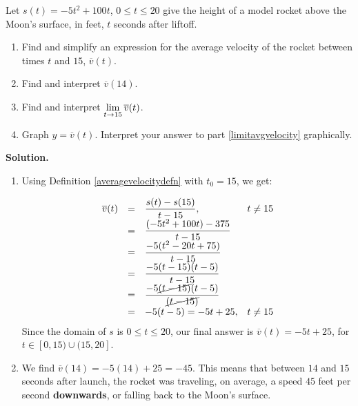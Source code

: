 \documentclass{ximera}
\begin{document}
\begin{ex} \label{averagevelocityrocketex} Let $s(t) = -5t^2+100t$, $0 \leq t \leq 20$ give the height of a model rocket above the Moon's surface, in feet,  $t$ seconds after liftoff.  

\begin{enumerate}

\item  Find and simplify an expression for the average velocity of the rocket between times $t$ and $15$, $\overline{v}(t)$.

\item Find and interpret $\overline{v}(14)$.

\item \label{limitavgvelocity} Find and interpret $\ds{ \lim_{t \rightarrow 15} \overline{v}(t)}$.

\item  Graph $y = \overline{v}(t)$.  Interpret your answer to part \ref{limitavgvelocity} graphically.

\end{enumerate}

{\bf Solution.}

\begin{enumerate}

\item \label{findandsimplifyavgvelocity} Using Definition \ref{averagevelocitydefn} with $t_{0} = 15$, we get: 

\[ \begin{array}{rclr}

 \overline{v}(t) & = & \dfrac{s(t) - s(15)}{t-15} , & \text{$t \neq 15$}  \\
                       & =  & \dfrac{(-5t^2+100t) - 375}{t - 15} &   \\
                        & =  & \dfrac{-5(t^2-20t+75)}{t - 15} &   \\
                        & = & \dfrac{-5(t-15)(t-5)}{t-15} &   \\
                        & = &  \dfrac{-5\cancel{(t-15)} (t-5)}{\cancel{(t-15)}}  & \\
                         & = & -5(t-5) = -5t + 25, & \text{$t \neq 15$} \end{array} \]
Since  the domain of $s$ is  $0 \leq t \leq 20$, our final answer is $\overline{v}(t) = -5t+25$,  for $t \in [0, 15) \cup (15, 20]$. 

\item  We find $\overline{v}(14) = -5(14)+25 = -45$.  This means that between  $14$ and $15$ seconds after launch, the rocket was traveling, on average,  a speed $45$ feet per second \textbf{downwards}, or falling back to the Moon's surface.



\end{enumerate}
\end{ex}
\end{document}
